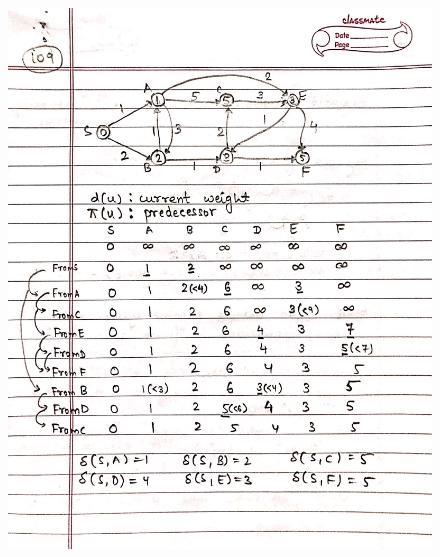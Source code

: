 \begin{figure}[H]
    \centering
    \includegraphics[scale=0.25]{"./MIT 6.006/MIT_6006_109"}
\end{figure}
\newpage
